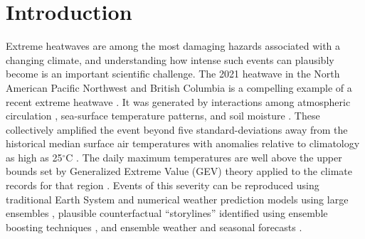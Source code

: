 \documentclass[draft]{agujournal2019}
\begin{document}

%
%

\section{Introduction} \label{sec:intro}

Extreme heatwaves are among the most damaging hazards associated with a changing climate, and understanding how intense such events can plausibly become is an important scientific challenge. The 2021 heatwave in the North American Pacific Northwest and British Columbia is a compelling example of a recent extreme heatwave \citep{White_2023}. It was generated by interactions among atmospheric circulation \citep{Wang_2023}, sea-surface temperature patterns, and soil moisture \citep{Schumacher_2022}. These collectively amplified the event beyond five standard-deviations away from the historical median surface  air temperatures \citep{Bartusek_2022} with anomalies relative to climatology as high as 25$^\circ$C \citep{Emerton_2022}.  The daily maximum temperatures are well above the upper bounds set by Generalized Extreme Value (GEV) theory applied to the climate records for that region \citep{Bercos-Hickey_2022}. Events of this severity can be reproduced using traditional Earth System  and numerical weather prediction models using large ensembles \citep{McKinnon_2022}, plausible counterfactual ``storylines'' identified using ensemble boosting techniques \citep{Fischer_2023}, and ensemble weather and seasonal forecasts \citep{Leach_2024, Finkel2023, Kelder2020}.
\end{document}
